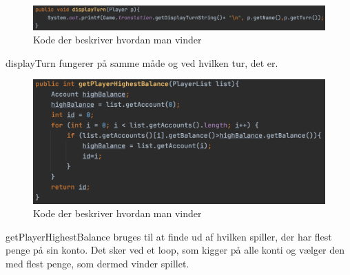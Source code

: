 \begin{figure}[H]
    \centering
    \includegraphics{sources/7_implementering/LogicdisplayTurn.png}
    \caption{Kode der beskriver hvordan man vinder}
    \label{fig:logicDisplayTurn}
\end{figure}
displayTurn fungerer på samme måde og ved hvilken tur, det er.

\begin{figure}[H]
    \centering
    \includegraphics{sources/7_implementering/LogicgetHighestBalance.png}
    \caption{Kode der beskriver hvordan man vinder}
    \label{fig:logicHighestBalance}
\end{figure}
getPlayerHighestBalance bruges til at finde ud af hvilken spiller, der har flest penge på sin konto. Det sker ved et loop, som kigger på alle konti og vælger den med flest penge, som dermed vinder spillet.

